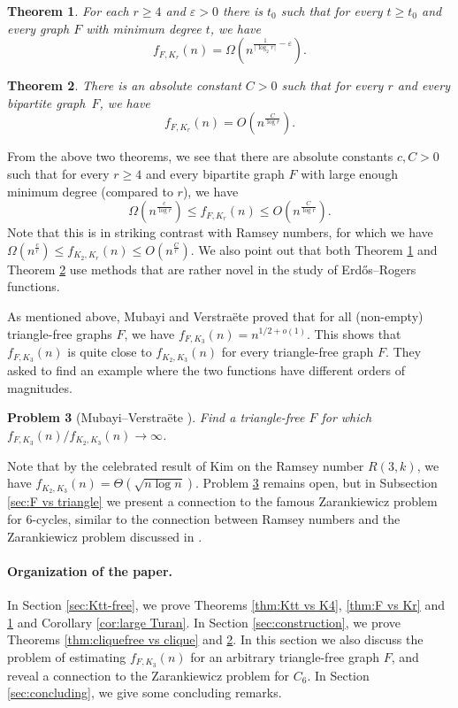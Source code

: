\documentclass[11pt]{article}
\theoremstyle{plain}
\newtheorem{theorem}{Theorem}[section]
\newtheorem{problem}[theorem]{Problem}
\theoremstyle{definition}
\begin{document}
\begin{theorem} \label{thm:Ktt vs Kr lower bound}
    For each $r\geq 4$ and $\varepsilon > 0$ there is $t_0$ such that for every $t \geq t_0$ and every graph $F$ with minimum degree $t$, we have
    $$
    f_{F,K_r}(n) = \Omega(n^{\frac{1}{\lceil \log_2 r \rceil} - \varepsilon}).
    $$
\end{theorem}
\begin{theorem}\label{thm:Ktt vs Kr upper bound}
      There is an absolute constant $C > 0$ such that for every $r$ and every bipartite graph~$F$, we have
    $$f_{F,K_r}(n)= O(n^{\frac{C}{\log r}}).$$
\end{theorem}

From the above two theorems, we see that there are absolute constants $c,C > 0$ such that for every $r \geq 4$ and every bipartite graph $F$ with large enough minimum degree (compared to $r$), we \nolinebreak have
$$\Omega(n^{\frac{c}{\log r}})\leq f_{F,K_r}(n)\leq O(n^{\frac{C}{\log r}}).$$
Note that this is in striking contrast with Ramsey numbers, for which we have $\Omega(n^{\frac{c}{r}})\leq f_{K_2,K_r}(n)\leq O(n^{\frac{C}{r}})$. We also point out that both Theorem \ref{thm:Ktt vs Kr lower bound} and Theorem \ref{thm:Ktt vs Kr upper bound} use methods that are rather novel in the study of Erd\H os--Rogers functions. 

As mentioned above, Mubayi and Verstra\"ete \cite{MV_general_graphs} proved that for all (non-empty) triangle-free graphs $F$, we have $f_{F,K_3}(n)=n^{1/2+o(1)}$. This shows that $f_{F,K_3}(n)$ is quite close to $f_{K_2,K_3}(n)$ for every triangle-free graph $F$. They asked to find an example where the two functions have different orders of magnitudes.

\begin{problem}[Mubayi--Verstra\"ete \cite{MV_general_graphs}] \label{problem:F-free triangle-free}
    Find a triangle-free $F$ for which $f_{F,K_3}(n)/f_{K_2,K_3}(n)\rightarrow \infty$.
\end{problem}

\noindent Note that by the celebrated result of Kim \cite{Kim95} on the Ramsey number $R(3,k)$, we have $f_{K_2,K_3}(n)=\Theta(\sqrt{n \log n})$. Problem \ref{problem:F-free triangle-free} remains open, but in Subsection \ref{sec:F vs triangle} we present a connection to the famous Zarankiewicz problem for $6$-cycles, similar to the connection between Ramsey numbers and the Zarankiewicz problem discussed in \cite{CMMV24}.

\paragraph{Organization of the paper.} In Section \ref{sec:Ktt-free}, we prove Theorems \ref{thm:Ktt vs K4}, \ref{thm:F vs Kr} and \ref{thm:Ktt vs Kr lower bound} and Corollary \ref{cor:large Turan}. In Section \ref{sec:construction}, we prove Theorems \ref{thm:cliquefree vs clique} and \ref{thm:Ktt vs Kr upper bound}. In this section we also discuss the problem of estimating $f_{F,K_3}(n)$ for an arbitrary triangle-free graph $F$, and reveal a connection to the Zarankiewicz problem for $C_6$. In Section \ref{sec:concluding}, we give some concluding remarks.
\end{document}
